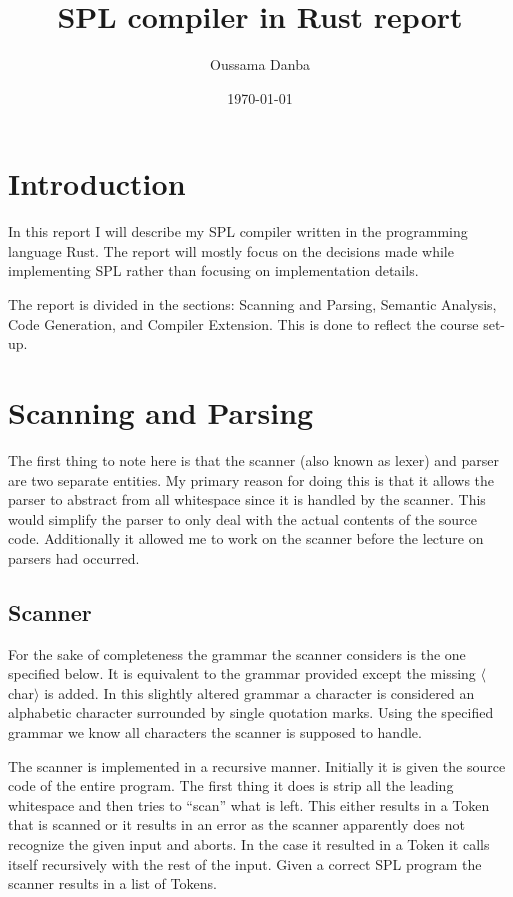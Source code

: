 \documentclass{article}
\title{SPL compiler in Rust report}
\author{Oussama Danba}
\date{\today}
\begin{document}
\maketitle

\section{Introduction}
In this report I will describe my SPL compiler written in the programming language Rust. The report will mostly focus on the decisions made while implementing SPL rather than focusing on implementation details.

The report is divided in the sections: Scanning and Parsing, Semantic Analysis, Code Generation, and Compiler Extension. This is done to reflect the course set-up.

\section{Scanning and Parsing}
The first thing to note here is that the scanner (also known as lexer) and parser are two separate entities. My primary reason for doing this is that it allows the parser to abstract from all whitespace since it is handled by the scanner. This would simplify the parser to only deal with the actual contents of the source code. Additionally it allowed me to work on the scanner before the lecture on parsers had occurred.

\subsection{Scanner}
For the sake of completeness the grammar the scanner considers is the one specified below. It is equivalent to the grammar provided except the missing $\langle$char$\rangle$ is added. In this slightly altered grammar a character is considered an alphabetic character surrounded by single quotation marks. Using the specified grammar we know all characters the scanner is supposed to handle.

The scanner is implemented in a recursive manner. Initially it is given the source code of the entire program. The first thing it does is strip all the leading whitespace and then tries to ``scan'' what is left. This either results in a Token that is scanned or it results in an error as the scanner apparently does not recognize the given input and aborts. In the case it resulted in a Token it calls itself recursively with the rest of the input. Given a correct SPL program the scanner results in a list of Tokens.
\end{document}
